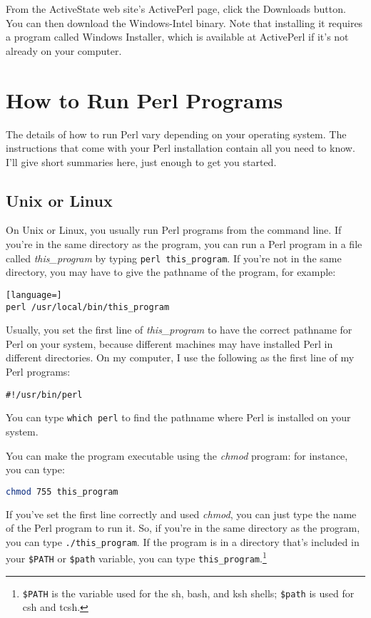 From the ActiveState web site's ActivePerl page, click the Downloads button. You can then download the Windows-Intel binary. Note that installing it requires a program called Windows Installer, which is available at ActivePerl if it's not already on your computer. 

\section{How to Run Perl Programs}
The details of how to run Perl vary depending on your operating system. The instructions that come with your Perl installation contain all you need to know. I'll give short summaries here, just enough to get you started.

\subsection{Unix or Linux}
On Unix or Linux, you usually run Perl programs from the command line.  If you're in the same directory as the program, you can run a Perl program in a file called \textit{this\_program} by typing \verb|perl this_program|. If you're not in the same directory, you may have to give the pathname of the program, for example:

\begin{lstlisting}[language=]
perl /usr/local/bin/this_program
\end{lstlisting}

Usually, you set the first line of \textit{this\_program} to have the correct pathname for Perl on your system, because different machines may have installed Perl in different directories. On my computer, I use the following as the first line of my Perl programs:

\begin{lstlisting}
#!/usr/bin/perl
\end{lstlisting}

You can type \verb|which perl| to find the pathname where Perl is installed on your system.

You can make the program executable using the \textit{chmod} program: for instance, you can type:

\begin{lstlisting}[language=bash]
chmod 755 this_program
\end{lstlisting}

If you've set the first line correctly and used \textit{chmod}, you can just type the name of the Perl program to run it. So, if you're in the same directory as the program, you can type \verb|./this_program|. If the program is in a directory that's included in your \verb|$PATH| or \verb|$path| variable, you can type \verb|this_program|.\footnote{\verb|$PATH| is the variable used for the sh, bash, and ksh shells; \verb|$path| is used for csh and tcsh.}


